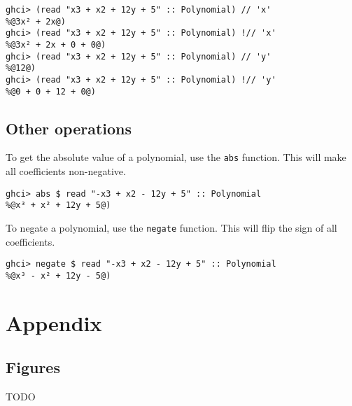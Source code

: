 \documentclass[11pt,a4paper]{article}
\begin{document}
\begin{lstlisting}
ghci> (read "x3 + x2 + 12y + 5" :: Polynomial) // 'x'
%@3x² + 2x@)
ghci> (read "x3 + x2 + 12y + 5" :: Polynomial) !// 'x'
%@3x² + 2x + 0 + 0@)
ghci> (read "x3 + x2 + 12y + 5" :: Polynomial) // 'y'
%@12@)
ghci> (read "x3 + x2 + 12y + 5" :: Polynomial) !// 'y'
%@0 + 0 + 12 + 0@)
\end{lstlisting}

\subsection{Other operations}

To get the absolute value of a polynomial, use the \lstinline{abs} function.
This will make all coefficients non-negative.

\begin{lstlisting}
ghci> abs $ read "-x3 + x2 - 12y + 5" :: Polynomial
%@x³ + x² + 12y + 5@)
\end{lstlisting}

To negate a polynomial, use the \lstinline{negate} function.
This will flip the sign of all coefficients.

\begin{lstlisting}
ghci> negate $ read "-x3 + x2 - 12y + 5" :: Polynomial
%@x³ - x² + 12y - 5@)
\end{lstlisting}

\pagebreak

\appendix
\section{Appendix}

\subsection{Figures}

TODO
\end{document}
